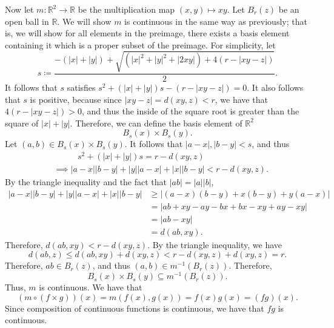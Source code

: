 \documentclass[11pt, letterpaper]{article}
\begin{document}
Now let $m : \mathbb{R} ^2 \to \mathbb{R} $ be the multiplication map $(x,y)\mapsto xy$. Let $B_r(z)$ be an open ball in $\mathbb{R} $. We will show $m$ is continuous in the same way as previously; that is, we will show for all elements in the preimage, there exists a basis element containing it which is a proper subset of the preimage. For simplicity, let
\[
	s\coloneqq \frac{-(\left| x \right| +\left| y \right| )+\sqrt{\left( \left| x \right| ^2+\left| y \right| ^2+\left| 2xy \right|  \right) +4\left( r-\left| xy-z \right|  \right) } }{2} 
.\]
It follows that $s$ satisfies $s^2+\left( \left| x \right| +\left| y \right|  \right) s-(r-\left| xy-z \right| )=0$. It also follows that $s$ is positive, because since $\left| xy-z \right| =d(xy,z)<r$, we have that $4(r-\left| xy-z \right| )>0$, and thus the inside of the square root is greater than the square of $\left| x \right| +\left| y \right| $. Therefore, we can define the basis element of $\mathbb{R} ^2$
\[
	B_s(x)\times B_s(y)
.\]
Let $(a,b)\in B_s(x)\times B_s(y)$. It follows that $\left| a-x \right| ,\left| b-y \right| <s$, and thus
\begin{align*}
	&\qquad\;\;\;s^2+\left( \left| x \right| +\left| y \right|  \right) s=r-d(xy,z)\\
	&\implies \left| a-x \right| \left| b-y \right| +\left| y \right| \left| a-x \right| +\left| x \right| \left| b-y \right| <r-d(xy,z)
.\end{align*}
By the triangle inequality and the fact that $\left| ab \right| =\left| a \right| \left| b \right| $,
\begin{align*}
	\left| a-x \right| \left| b-y \right| +\left| y \right| \left| a-x \right| +\left| x \right| \left| b-y \right| &\geq \left| \left( a-x \right) \left( b-y \right) +x(b-y)+y(a-x) \right| \\
															&=\left| ab+xy-ay-bx+bx-xy+ay-xy \right| \\
															&=\left| ab-xy \right| \\
															&=d(ab,xy)
.\end{align*}
Therefore, $d(ab,xy)<r-d(xy,z)$. By the triangle inequality, we have
\[
	d(ab,z)\leq d(ab,xy)+d(xy,z)<r-d(xy,z)+d(xy,z)=r
.\]
Therefore, $ab\in B_r(z)$, and thus $(a,b)\in m ^{-1} \left( B_r(z) \right) $. Therefore,
\[
	B_s(x)\times B_s(y)\subseteq m ^{-1} \left( B_r(z) \right) 
.\]
Thus, $m$ is continuous. We have that
\[
	(m\circ (f\times g))(x)=m(f(x),g(x))=f(x)g(x)=(fg)(x)
.\]
Since composition of continuous functions is continuous, we have that $fg$ is continuous.
\end{document}
